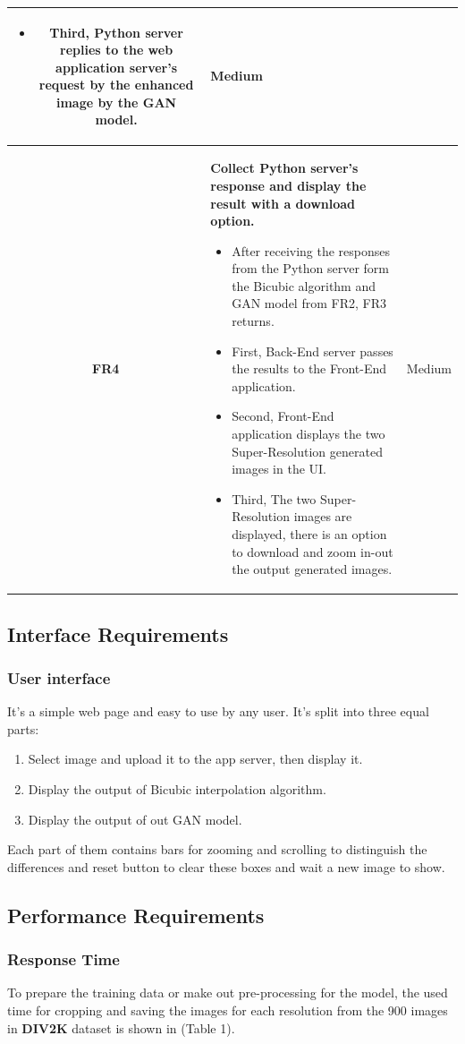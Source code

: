 \documentclass[12pt]{article}
\begin{document}
\begin{longtable}{|c|p{}|c|}
\begin{itemize}
					\item Third, Python server replies to the web application server's request by the enhanced image by the GAN model.
				\end{itemize} & Medium \\
				\hline
				\textbf{FR4} & \textbf{Collect Python server's response and display the result with a download option.}
				\begin{itemize}
					\item After receiving the responses from the Python server form the Bicubic algorithm and GAN model from FR2, FR3 returns.
					\item First, Back-End server passes the results to the Front-End application.
					\item Second, Front-End application displays the two Super-Resolution generated images in the UI.
					\item Third, The two Super-Resolution images are displayed, there is an option to download and zoom in-out the output generated images.
				\end{itemize} & Medium \\
				\hline
			\end{longtable}
		\subsection{Interface Requirements}
			\subsubsection{User interface}
				It’s a simple web page and easy to use by any user. It’s split into three equal parts:
				\begin{enumerate}
					\item Select image and upload it to the app server, then display it.
					\item Display the output of Bicubic interpolation algorithm.
					\item Display the output of out GAN model.
				\end{enumerate}
				
				Each part of them contains bars for zooming and scrolling to distinguish the differences and reset button to clear these boxes and wait a new image to show.
		\subsection{Performance Requirements}
			\subsubsection{Response Time}
				To prepare the training data or make out pre-processing for the model, the used time for cropping and saving the images for each resolution from the 900 images in \textbf{DIV2K} \cite{29} dataset is shown in (Table 1).
				
\end{document}
